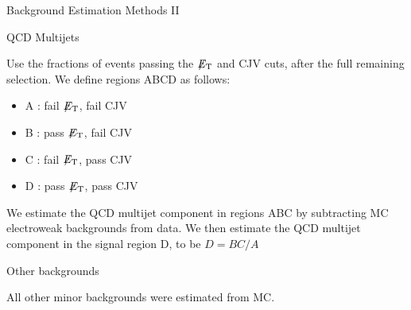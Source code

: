 \documentclass[8pt]{beamer}
\newcommand{\met}{\displaystyle{\not} E_{\rm T}}
\begin{document}
\begin{frame}{Background Estimation Methods II}

\begin{block}{QCD Multijets}

Use the fractions of events passing the $\met$ and CJV cuts, after the full remaining selection. We define regions ABCD as follows:

\begin{itemize}
 \item{A : fail $\met$, fail CJV}
 \item{B : pass $\met$, fail CJV}
 \item{C : fail $\met$, pass CJV}
 \item{D : pass $\met$, pass CJV}
\end{itemize}

We estimate the QCD multijet component in regions ABC by subtracting MC electroweak backgrounds from data. We then estimate the QCD multijet component in the signal region D, to be $D = BC / A$

\end{block}

\begin{block}{Other backgrounds}
 
All other minor backgrounds were estimated from MC.
 
\end{block}
 
\end{frame}
\end{document}
